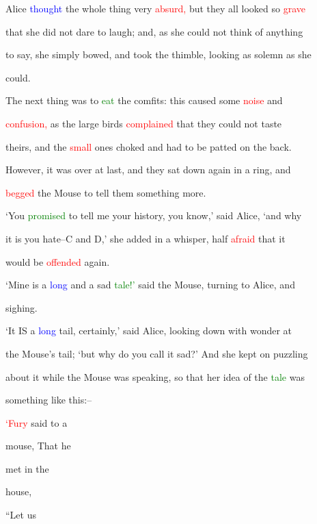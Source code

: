  Alice \textcolor{blue}{thought} the whole thing very \textcolor{red}{absurd,} but they all looked so \textcolor{red}{grave}

 that she did not \textcolor{BurntOrange}{dare} to \textcolor{BurntOrange}{laugh;} and, as she could not think of anything

 to say, she simply bowed, and took the thimble, looking as solemn as she

 could.



 The next thing was to \textcolor{green}{eat} the comfits: this caused some \textcolor{red}{noise} and

 \textcolor{red}{confusion,} as the large birds \textcolor{red}{complained} that they could not taste

 theirs, and the \textcolor{red}{small} ones choked and had to be patted on the back.

 However, it was over at last, and they sat down again in a ring, and

 \textcolor{red}{begged} the Mouse to tell them something more.



 ‘You \textcolor{green}{promised} to tell me your history, you know,’ said Alice, ‘and why

 it is you hate--C and D,’ she added in a whisper, half \textcolor{red}{afraid} that it

 would be \textcolor{red}{offended} again.



 ‘Mine is a \textcolor{blue}{long} and a sad \textcolor{green}{tale!’} said the Mouse, turning to Alice, and

 sighing.



 ‘It IS a \textcolor{blue}{long} tail, certainly,’ said Alice, looking down with wonder at

 the Mouse’s tail; ‘but why do you call it sad?’ And she kept on puzzling

 about it while the Mouse was speaking, so that her idea of the \textcolor{green}{tale} was

 something like this:--



 \textcolor{red}{‘Fury} said to a

 mouse, That he

 met in the

 house,

 “Let us

